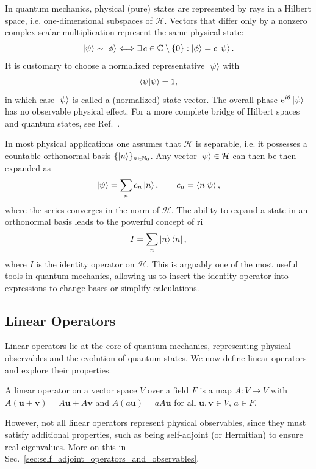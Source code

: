 In quantum mechanics, physical (pure) states are represented by rays in a Hilbert space, i.e. one-dimensional subspaces of $\mathcal{H}$. Vectors that differ only by a nonzero complex scalar multiplication represent the same physical state:
\begin{equation}
\ket{\psi}\sim\ket{\phi}\Longleftrightarrow\exists\,c\in\mathbb{C}\setminus\lbrace 0\rbrace:\ket{\phi}=c\ket{\psi}.
\end{equation}
It is customary to choose a normalized representative $\ket{\psi}$ with
\begin{equation}
\braket{\psi\vert\psi}=1,
\end{equation}
in which case $\ket{\psi}$ is called a (normalized) state vector. The overall phase $e^{i\theta}\ket{\psi}$ has no observable physical effect. For a more complete bridge  of Hilbert spaces and quantum states, see Ref.~\cite{1021172445}.

In most physical applications one assumes that $\mathcal{H}$ is separable, i.e. it possesses a countable orthonormal basis $\lbrace\ket{n}\rbrace_{n\in\mathbb{N}_0}$. Any vector $\ket{\psi}\in\mathcal{H}$ can then be then expanded as
\begin{equation}
\ket{\psi}=\sum_{n}c_n\ket{n},\qquad c_n=\braket{n\vert\psi},
\end{equation}
where the series converges in the norm of $\mathcal{H}$. The ability to expand a state in an orthonormal basis leads to the powerful concept of \gls{ri}
\begin{equation}
I=\sum_{n}\ket{n}\bra{n},
\end{equation}
where $I$ is the identity operator on $\mathcal{H}$. This is arguably one of the most useful tools in quantum mechanics, allowing us to insert the identity operator into expressions to change bases or simplify calculations.
\subsection{Linear Operators}\label{sec:linear_operators}
Linear operators lie at the core of quantum mechanics, representing physical observables and the evolution of quantum states. We now define linear operators and explore their properties.
\begin{definition}
A linear operator on a vector space $V$ over a field $F$ is a map $A:V\to V$ with $A(\symbf{u}+\symbf{v})=A\symbf{u}+A\symbf{v}$ and $A(a\symbf{u})=aA\symbf{u}$ for all $\symbf{u},\symbf{v}\in V$, $a\in F$.
\end{definition}
However, not all linear operators represent physical observables, since they must satisfy additional properties, such as being self-adjoint (or Hermitian) to ensure real eigenvalues. More on this in Sec.~\ref{sec:self_adjoint_operators_and_observables}.

